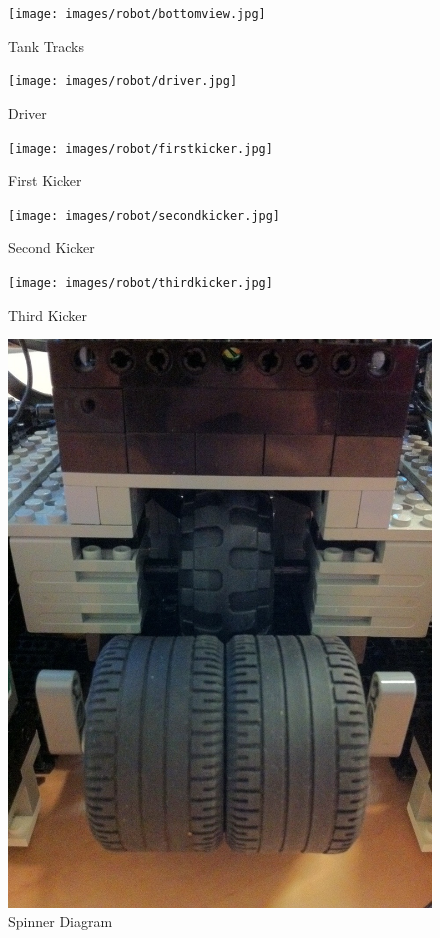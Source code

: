 \documentclass[12pt, a4paper, titlepage]{article}
\begin{document}
\begin{figure}[ht]
\begin{minipage}[b]{0.5\linewidth}
\centering
\texttt{[image: images/robot/bottomview.jpg]}
\caption{Tank Tracks}
\label{fig:tanktracks}
\end{minipage}
\hspace{0.5cm}
\begin{minipage}[b]{0.5\linewidth}
\centering
\texttt{[image: images/robot/driver.jpg]}
\caption{Driver}
\label{fig:driver}
\end{minipage}
\end{figure}

\begin{figure}[ht]
\begin{centering}
\begin{minipage}[b]{0.3\linewidth}
\centering
\texttt{[image: images/robot/firstkicker.jpg]}
\caption{First Kicker}
\label{fig:firstkicker}
\end{minipage}
\hspace{0.3cm}
\begin{minipage}[b]{0.3\linewidth}
\centering
\texttt{[image: images/robot/secondkicker.jpg]}
\caption{Second Kicker}
\label{fig:secondkicker}
\end{minipage}
\hspace{0.3cm}
\begin{minipage}[b]{0.3\linewidth}
\centering
\texttt{[image: images/robot/thirdkicker.jpg]}
\caption{Third Kicker}
\label{fig:thirdkicker}
\end{minipage}
\end{centering}
\end{figure}

\begin{figure}[ht]
\centering
\includegraphics[scale=0.8]{images/robot/spinner.jpg}
\caption{Spinner Diagram}
\label{fig:spinner}
\end{figure}
\end{document}
